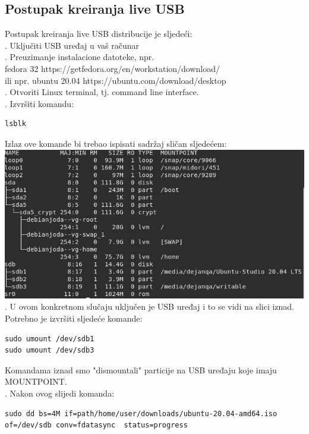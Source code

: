 \documentclass[12pt,vi]{mitthesis}
\begin{document}
\subsection*{Postupak kreiranja live USB}
\indent
Postupak kreiranja live USB distribucije je sljedeći:\\
. Uključiti USB uređaj u vaš računar\\
. Preuzimanje instalacione datoteke, npr.\\fedora 32 https://getfedora.org/en/workstation/download/\\
ili npr. ubuntu 20.04 https://ubuntu.com/download/desktop\\
. Otvoriti Linux terminal, tj. command line interface.\\
. Izvršiti komandu:\\
\indent
\begin{lstlisting}[style=BashInputStyle]
lsblk
\end{lstlisting}
\indent
Izlaz ove komande bi trebao ispisati sadržaj sličan sljedećem:\\
\includegraphics[width=\linewidth]{images/lsblkOutput.png}\\
. U ovom konkretnom slučaju uključen je USB uređaj i to se vidi na slici iznad. Potrebno je izvršiti sljedeće komande:
\begin{lstlisting}[style=BashInputStyle]
sudo umount /dev/sdb1
sudo umount /dev/sdb3
\end{lstlisting}
Komandama iznad smo "dismountali" particije na USB uređaju koje imaju MOUNTPOINT.\\
. Nakon ovog slijedi komanda:\\
\begin{lstlisting}[style=BashInputStyle]
sudo dd bs=4M if=path/home/user/downloads/ubuntu-20.04-amd64.iso of=/dev/sdb conv=fdatasync  status=progress
\end{lstlisting}
\end{document}
